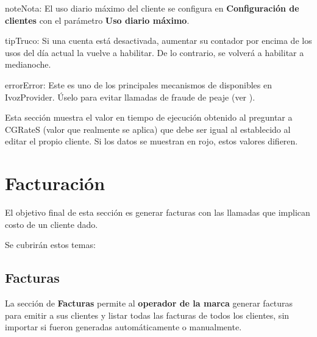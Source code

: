 \documentclass[letterpaper,10pt,spanish]{sphinxmanual}
\begin{document}
\begin{notice}{note}{Nota:}
El uso diario máximo del cliente se configura en \textbf{Configuración de clientes} con el parámetro \textbf{Uso diario máximo}.
\end{notice}

\begin{notice}{tip}{Truco:}
Si una cuenta está desactivada, aumentar su contador por encima de los usos del día actual la vuelve a habilitar. De lo contrario, se volverá a habilitar a medianoche.
\end{notice}

\begin{notice}{error}{Error:}
Este es uno de los principales mecanismos de {\hyperref[security_and_maintenance/security/index:security]{}} disponibles en IvozProvider. Úselo para evitar llamadas de fraude de peaje (ver {\hyperref[security_and_maintenance/security/current_day_max_usage:current\string-day\string-max\string-usage]{}}).
\end{notice}

Esta sección muestra el valor en tiempo de ejecución obtenido al preguntar a CGRateS (valor que realmente se aplica) que debe ser igual al establecido al editar el propio cliente. Si los datos se muestran en rojo, estos valores difieren.


\section{Facturación}
\label{administration_portal/brand/invoicing/index::doc}\label{administration_portal/brand/invoicing/index:invoicing}
El objetivo final de esta sección es generar facturas con las llamadas que implican costo de un cliente dado.

Se cubrirán estos temas:


\subsection{Facturas}
\label{administration_portal/brand/invoicing/invoices:invoices}\label{administration_portal/brand/invoicing/invoices::doc}\label{administration_portal/brand/invoicing/invoices:id1}
La sección de \textbf{Facturas} permite al \textbf{operador de la marca} generar facturas para emitir a sus clientes y listar todas las facturas de todos los clientes, sin importar si fueron generadas automáticamente o manualmente.
\end{document}
